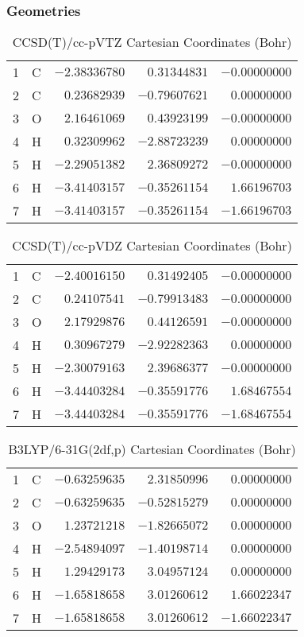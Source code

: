 \documentclass[10pt,oneside]{article}
\begin{document}
\subsubsection*{Geometries}
\begin{table}[h!]
\centering
\caption{CCSD(T)/cc-pVTZ Cartesian Coordinates (Bohr)}
\begin{tabular}{llrrr}
1  & C  & $-2.38336780$ & $ 0.31344831$ & $-0.00000000$ \\
2  & C  & $ 0.23682939$ & $-0.79607621$ & $ 0.00000000$ \\
3  & O  & $ 2.16461069$ & $ 0.43923199$ & $-0.00000000$ \\
4  & H  & $ 0.32309962$ & $-2.88723239$ & $ 0.00000000$ \\
5  & H  & $-2.29051382$ & $ 2.36809272$ & $-0.00000000$ \\
6  & H  & $-3.41403157$ & $-0.35261154$ & $ 1.66196703$ \\
7  & H  & $-3.41403157$ & $-0.35261154$ & $-1.66196703$ \\
\end{tabular}
\end{table}

\begin{table}[h!]
\centering
\caption{CCSD(T)/cc-pVDZ Cartesian Coordinates (Bohr)}
\begin{tabular}{llrrr}
1  & C  & $-2.40016150$ & $ 0.31492405$ & $-0.00000000$ \\
2  & C  & $ 0.24107541$ & $-0.79913483$ & $-0.00000000$ \\
3  & O  & $ 2.17929876$ & $ 0.44126591$ & $-0.00000000$ \\
4  & H  & $ 0.30967279$ & $-2.92282363$ & $ 0.00000000$ \\
5  & H  & $-2.30079163$ & $ 2.39686377$ & $-0.00000000$ \\
6  & H  & $-3.44403284$ & $-0.35591776$ & $ 1.68467554$ \\
7  & H  & $-3.44403284$ & $-0.35591776$ & $-1.68467554$ \\
\end{tabular}
\end{table}

\begin{table}[h!]
\centering
\caption{B3LYP/6-31G(2df,p) Cartesian Coordinates (Bohr)}
\begin{tabular}{llrrr}
1  & C  & $-0.63259635$ & $ 2.31850996$ & $ 0.00000000$ \\
2  & C  & $-0.63259635$ & $-0.52815279$ & $ 0.00000000$ \\
3  & O  & $ 1.23721218$ & $-1.82665072$ & $ 0.00000000$ \\
4  & H  & $-2.54894097$ & $-1.40198714$ & $ 0.00000000$ \\
5  & H  & $ 1.29429173$ & $ 3.04957124$ & $ 0.00000000$ \\
6  & H  & $-1.65818658$ & $ 3.01260612$ & $ 1.66022347$ \\
7  & H  & $-1.65818658$ & $ 3.01260612$ & $-1.66022347$ \\
\end{tabular}
\end{table}
\end{document}
